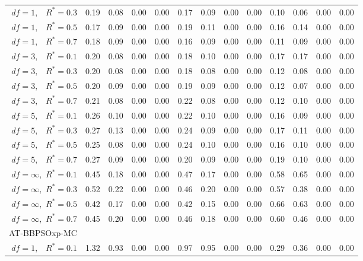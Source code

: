 \documentclass[12pt]{article}
\begin{document}
\begin{appendix}
\begin{table}[ht]
{\begin{tabular}{r|rrrr|rrrr|rrrr}
  $df = 1,\enspace$ $R^* =0.3$ & 0.19 & 0.08 & 0.00 & 0.00 & 0.17 & 0.09 & 0.00 & 0.00 & 0.10 & 0.06 & 0.00 & 0.00 \\ 
  $df = 1,\enspace$ $R^* =0.5$ & 0.17 & 0.09 & 0.00 & 0.00 & 0.19 & 0.11 & 0.00 & 0.00 & 0.16 & 0.14 & 0.00 & 0.00 \\ 
  $df = 1,\enspace$ $R^* =0.7$ & 0.18 & 0.09 & 0.00 & 0.00 & 0.16 & 0.09 & 0.00 & 0.00 & 0.11 & 0.09 & 0.00 & 0.00 \\ 
  $df = 3,\enspace$ $R^* =0.1$ & 0.20 & 0.08 & 0.00 & 0.00 & 0.18 & 0.10 & 0.00 & 0.00 & 0.17 & 0.17 & 0.00 & 0.00 \\ 
  $df = 3,\enspace$ $R^* =0.3$ & 0.20 & 0.08 & 0.00 & 0.00 & 0.18 & 0.08 & 0.00 & 0.00 & 0.12 & 0.08 & 0.00 & 0.00 \\ 
  $df = 3,\enspace$ $R^* =0.5$ & 0.20 & 0.09 & 0.00 & 0.00 & 0.19 & 0.09 & 0.00 & 0.00 & 0.12 & 0.07 & 0.00 & 0.00 \\ 
  $df = 3,\enspace$ $R^* =0.7$ & 0.21 & 0.08 & 0.00 & 0.00 & 0.22 & 0.08 & 0.00 & 0.00 & 0.12 & 0.10 & 0.00 & 0.00 \\ 
  $df = 5,\enspace$ $R^* =0.1$ & 0.26 & 0.10 & 0.00 & 0.00 & 0.22 & 0.10 & 0.00 & 0.00 & 0.16 & 0.09 & 0.00 & 0.00 \\ 
  $df = 5,\enspace$ $R^* =0.3$ & 0.27 & 0.13 & 0.00 & 0.00 & 0.24 & 0.09 & 0.00 & 0.00 & 0.17 & 0.11 & 0.00 & 0.00 \\ 
  $df = 5,\enspace$ $R^* =0.5$ & 0.25 & 0.08 & 0.00 & 0.00 & 0.24 & 0.10 & 0.00 & 0.00 & 0.16 & 0.10 & 0.00 & 0.00 \\ 
  $df = 5,\enspace$ $R^* =0.7$ & 0.27 & 0.09 & 0.00 & 0.00 & 0.20 & 0.09 & 0.00 & 0.00 & 0.19 & 0.10 & 0.00 & 0.00 \\ 
  $df = \infty,$ $R^* =0.1$ & 0.45 & 0.18 & 0.00 & 0.00 & 0.47 & 0.17 & 0.00 & 0.00 & 0.58 & 0.65 & 0.00 & 0.00 \\ 
  $df = \infty,$ $R^* =0.3$ & 0.52 & 0.22 & 0.00 & 0.00 & 0.46 & 0.20 & 0.00 & 0.00 & 0.57 & 0.38 & 0.00 & 0.00 \\ 
  $df = \infty,$ $R^* =0.5$ & 0.42 & 0.17 & 0.00 & 0.00 & 0.42 & 0.15 & 0.00 & 0.00 & 0.66 & 0.63 & 0.00 & 0.00 \\ 
  $df = \infty,$ $R^* =0.7$ & 0.45 & 0.20 & 0.00 & 0.00 & 0.46 & 0.18 & 0.00 & 0.00 & 0.60 & 0.46 & 0.00 & 0.00 \\ 
\hline
\multicolumn{1}{l|}{AT-BBPSOxp-MC} &&&&&&&&&&&&\\
  $df = 1,\enspace$ $R^* =0.1$ & 1.32 & 0.93 & 0.00 & 0.00 & 0.97 & 0.95 & 0.00 & 0.00 & 0.29 & 0.36 & 0.00 & 0.00 \\ 

\end{tabular}}
\end{table}
\end{appendix}
\end{document}
